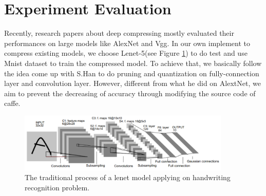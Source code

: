 \documentclass[a4paper]{article}
\begin{document}
\section{Experiment Evaluation}
\par Recently, research papers about deep compressing mostly evaluated their performances on large models like AlexNet and Vgg. In our own implement to compress existing models, we choose Lenet-5(see Figure \ref{lenet}) to do test and use Mnist dataset to train the compressed model. To achieve that, we basically follow the idea come up with S.Han\cite{deepcompress} to do pruning and quantization on fully-connection layer and convolution layer. However, different from what he did on AlextNet, we aim to prevent the decreasing of accuracy through modifying the source code of caffe.
\begin{figure}
\centering
\includegraphics[width=0.9\textwidth]{lenet.png}
\caption{\label{lenet}The traditional process of a lenet model applying on handwriting recognition problem.}
\end{figure}
\end{document}
